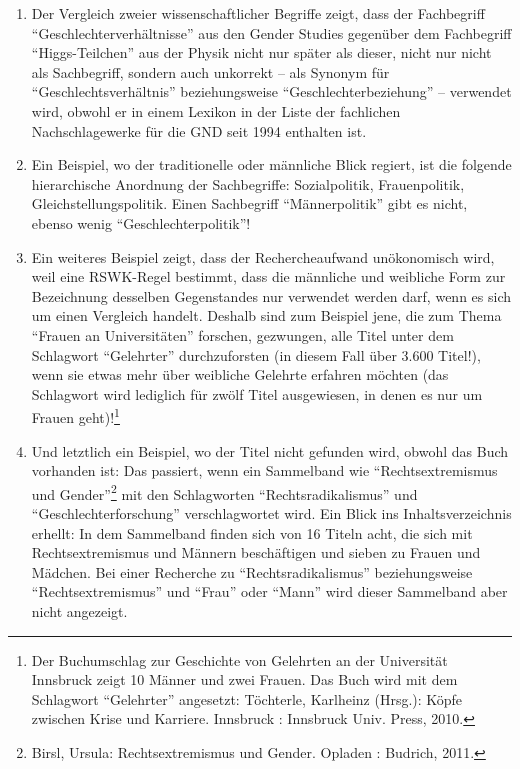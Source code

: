 \begin{enumerate}
\def\labelenumi{\arabic{enumi}.}
\item
  Der Vergleich zweier wissenschaftlicher Begriffe zeigt, dass der
  Fachbegriff \enquote{Geschlechterverhältnisse} aus den Gender Studies
  gegenüber dem Fachbegriff \enquote{Higgs-Teilchen} aus der Physik
  nicht nur später als dieser, nicht nur nicht als Sachbegriff, sondern
  auch unkorrekt -- als Synonym für \enquote{Geschlechtsverhältnis}
  beziehungsweise \enquote{Geschlechterbeziehung} -- verwendet wird,
  obwohl er in einem Lexikon in der Liste der fachlichen
  Nachschlagewerke für die GND seit 1994 enthalten ist.
\item
  Ein Beispiel, wo der traditionelle oder männliche Blick regiert, ist
  die folgende hierarchische Anordnung der Sachbegriffe: Sozialpolitik,
  Frauenpolitik, Gleichstellungspolitik. Einen Sachbegriff
  \enquote{Männerpolitik} gibt es nicht, ebenso wenig
  \enquote{Geschlechterpolitik}!
\item
  Ein weiteres Beispiel zeigt, dass der Rechercheaufwand unökonomisch
  wird, weil eine RSWK-Regel bestimmt, dass die männliche und weibliche
  Form zur Bezeichnung desselben Gegenstandes nur verwendet werden darf,
  wenn es sich um einen Vergleich handelt. Deshalb sind zum Beispiel
  jene, die zum Thema \enquote{Frauen an Universitäten} forschen,
  gezwungen, alle Titel unter dem Schlagwort \enquote{Gelehrter}
  durchzuforsten (in diesem Fall über 3.600 Titel!), wenn sie etwas mehr
  über weibliche Gelehrte erfahren möchten (das Schlagwort wird
  lediglich für zwölf Titel ausgewiesen, in denen es nur um Frauen
  geht)!\footnote{Der Buchumschlag zur Geschichte von Gelehrten an der
    Universität Innsbruck zeigt 10 Männer und zwei Frauen. Das Buch wird
    mit dem Schlagwort \enquote{Gelehrter} angesetzt: Töchterle,
    Karlheinz (Hrsg.): Köpfe zwischen Krise und Karriere. Innsbruck :
    Innsbruck Univ. Press, 2010.}
\item
  Und letztlich ein Beispiel, wo der Titel nicht gefunden wird, obwohl
  das Buch vorhanden ist: Das passiert, wenn ein Sammelband wie
  \enquote{Rechtsextremismus und Gender}\footnote{Birsl, Ursula:
    Rechtsextremismus und Gender. Opladen : Budrich, 2011.} mit den
  Schlagworten \enquote{Rechtsradikalismus} und
  \enquote{Geschlechterforschung} verschlagwortet wird. Ein Blick ins
  Inhaltsverzeichnis erhellt: In dem Sammelband finden sich von 16
  Titeln acht, die sich mit Rechtsextremismus und Männern beschäftigen
  und sieben zu Frauen und Mädchen. Bei einer Recherche zu
  \enquote{Rechtsradikalismus} beziehungsweise
  \enquote{Rechtsextremismus} und \enquote{Frau} oder \enquote{Mann}
  wird dieser Sammelband aber nicht angezeigt.
\end{enumerate}

